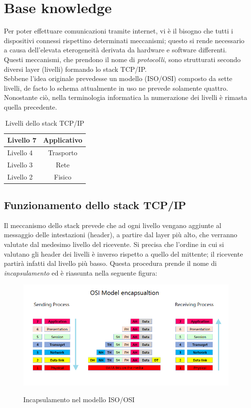 \chapter{Base knowledge}

Per poter effettuare comunicazioni tramite internet, vi è il bisogno che tutti i dispositivi connessi rispettino determinati meccanismi; questo si rende necessario a causa dell'elevata eterogeneità derivata da hardware e software differenti.
Questi meccanismi, che prendono il nome di \textit{protocolli}, sono strutturati secondo diversi layer (livelli) formando lo stack TCP/IP.  \\
Sebbene l'idea originale prevedesse un modello (ISO/OSI) composto da sette livelli, de facto lo schema attualmente in uso ne prevede solamente quattro. Nonostante ciò, nella terminologia informatica la numerazione dei livelli è rimasta quella precedente.
\\
\begin{table}[htb]
	\centering
	\begin{tabular}{| l | c |}
		\hline
		Livello 7 & Applicativo
		\\
		\hline
		Livello 4 & Trasporto
		\\
		\hline
		Livello 3 & Rete
		\\
		\hline
		Livello 2 & Fisico
		\\
		\hline
		
	\end{tabular}
	\caption{Livelli dello stack TCP/IP}
	\label{tab:stack}
\end{table}

\section{Funzionamento dello stack TCP/IP}
Il meccanismo dello stack prevede che ad ogni livello vengano aggiunte al messaggio delle intestazioni (header), a partire dal layer più alto, che verranno valutate dal medesimo livello del ricevente.
Si precisa che l'ordine in cui si valutano gli header dei livelli è inverso rispetto a quello del mittente; il ricevente partirà infatti dal livello più basso.
Questa procedura prende il nome di \textit{incapsulamento} ed è riassunta nella seguente figura:


\begin{figure}[h]
	\centering
	\includegraphics[width=\textwidth]{figures/incapsulamento.png}
	\caption{Incapsulamento nel modello ISO/OSI}
	\label{incapsulamento}
	\cite{incapsulamento}
\end{figure}

